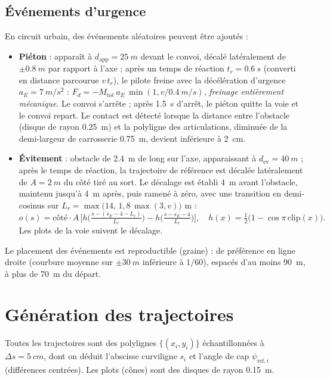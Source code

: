 \documentclass[11pt,a4paper]{article}
\begin{document}
\subsection{Événements d'urgence}\label{sec:emerg}
En circuit urbain, des événements aléatoires peuvent être ajoutés :
\begin{itemize}
 \item \textbf{Piéton} : apparaît à $d_{\text{app}}=\SI{25}{m}$ devant le convoi, décalé latéralement de $\pm\SI{0,8}{m}$ par rapport à l'axe ; après un temps de réaction $t_r=\SI{0,6}{s}$ (converti en distance parcourue $v\,t_r$), le pilote freine avec la décélération d'urgence $a_E=\SI{7}{m/s^2}$ : $F_d=-M_{\text{tot}}\,a_E\,\min(1,v/\SI{0,4}{m/s})$, \emph{freinage entièrement mécanique}. Le convoi s'arrête ; après \SI{1,5}{s} d'arrêt, le piéton quitte la voie et le convoi repart. Le contact est détecté lorsque la distance entre l'obstacle (disque de rayon \SI{0,25}{m}) et la polyligne des articulations, diminuée de la demi-largeur de carrosserie \SI{0,75}{m}, devient inférieure à \SI{2}{cm}.
 \item \textbf{Évitement} : obstacle de \SI{2,4}{m} de long sur l'axe, apparaissant à $d_{\text{ev}}=\SI{40}{m}$ ; après le temps de réaction, la trajectoire de référence est décalée latéralement de $A=\SI{2}{m}$ du côté tiré au sort. Le décalage est établi 4~m avant l'obstacle, maintenu jusqu'à 4~m après, puis ramené à zéro, avec une transition en demi-cosinus sur $L_r=\max\big(14,\,1{,}8\,\max(3,v)\big)$ m :
 \begin{equation}
  o(s)=\text{côté}\cdot A\,\Big[h\!\Big(\tfrac{s-(s_E-4-L_r)}{L_r}\Big)-h\!\Big(\tfrac{s-s_E-4}{L_r}\Big)\Big],\quad h(x)=\tfrac12\big(1-\cos\pi\,\mathrm{clip}(x)\big).
 \end{equation}
 Les plots de la voie suivent le décalage.
\end{itemize}
Le placement des événements est reproductible (graine) : de préférence en ligne droite (courbure moyenne sur $\pm\SI{30}{m}$ inférieure à $1/60$), espacés d'au moins \SI{90}{m}, à plus de \SI{70}{m} du départ.

\section{Génération des trajectoires}
Toutes les trajectoires sont des polylignes $\{(x_i,y_i)\}$ échantillonnées à $\Delta s=\SI{5}{cm}$, dont on déduit l'abscisse curviligne $s_i$ et l'angle de cap $\psi_{\text{ref},i}$ (différences centrées). Les plots (cônes) sont des disques de rayon \SI{0,15}{m}.
\end{document}
